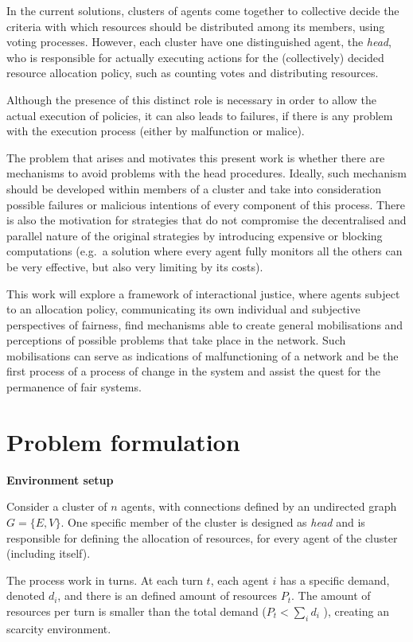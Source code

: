 \documentclass[conference,compsoc]{IEEEtran}
\begin{document}
In the current solutions, clusters of agents come together to collective decide the criteria with which resources should be distributed among its members, using voting processes. However, each cluster have one distinguished agent, the \emph{head}, who is responsible for actually executing actions for the (collectively) decided resource allocation policy, such as counting votes and distributing resources.


Although the presence of this distinct role is necessary in order to allow the actual execution of policies, it can also leads to failures, if there is any problem with the execution process (either by malfunction or malice).

The problem that arises and motivates this present work is whether there are mechanisms to avoid problems with the head procedures. Ideally, such mechanism should be developed within members of a cluster and take into consideration possible failures or malicious intentions of every component of this process. There is also the motivation for strategies that do not compromise the decentralised and parallel nature of the original strategies by introducing expensive or blocking computations (e.g.\ a solution where every agent fully monitors all the others can be very effective, but also very limiting by its costs).


This work will explore a framework of interactional justice, where agents subject to an allocation policy, communicating its own individual and subjective perspectives of fairness, find mechanisms able to create general mobilisations and perceptions of possible problems that take place in the network. Such mobilisations can serve as indications of malfunctioning of a network and be the first process of a process of change in the system and assist the quest for the permanence of fair systems.

\section{Problem formulation}

\noindent
\textbf{Environment setup}

Consider a cluster of $n$ agents, with connections defined by an undirected graph $G = \{E,V\}$. One specific member of the cluster is designed as \emph{head} and is responsible for defining the allocation of resources, for every agent of the cluster (including itself).

The process work in turns. At each turn $t$, each agent $i$ has a specific demand, denoted $d_i$, and there is an defined amount of resources $P_t$. The amount of resources per turn is smaller than the total demand ($P_t < \sum_i d_i$ ), creating an scarcity environment.
\end{document}
